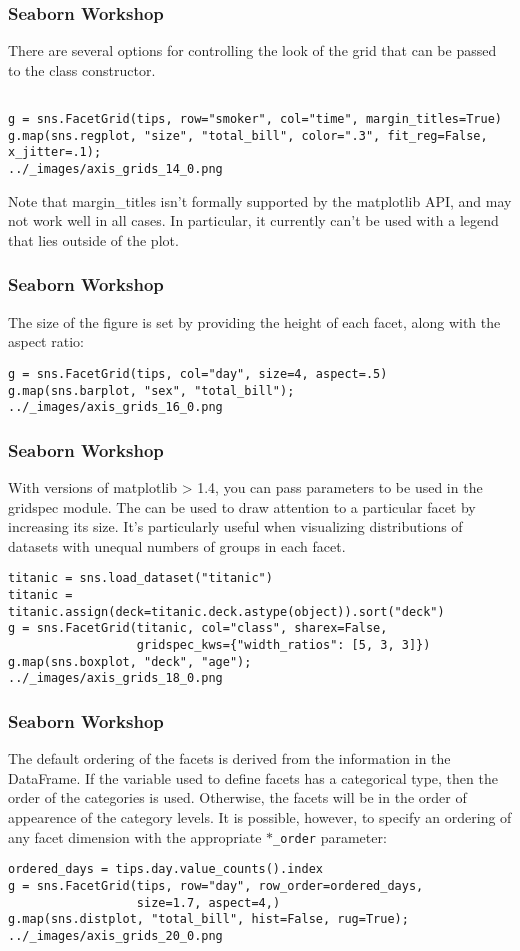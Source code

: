 \documentclass{beamer}
\begin{document}
\begin{frame}[fragile]
\frametitle{Seaborn Workshop}
\large

There are several options for controlling the look of the grid that can be passed to the class constructor.

\begin{verbatim}

g = sns.FacetGrid(tips, row="smoker", col="time", margin_titles=True)
g.map(sns.regplot, "size", "total_bill", color=".3", fit_reg=False, x_jitter=.1);
../_images/axis_grids_14_0.png
\end{verbatim}
Note that margin\_titles isn’t formally supported by the matplotlib API, and may not work well in all cases. In particular, it currently can’t be used with a legend that lies outside of the plot.
\end{frame}
\begin{frame}[fragile]
\frametitle{Seaborn Workshop}
\large
The size of the figure is set by providing the height of each facet, along with the aspect ratio:
\begin{verbatim}
g = sns.FacetGrid(tips, col="day", size=4, aspect=.5)
g.map(sns.barplot, "sex", "total_bill");
../_images/axis_grids_16_0.png
\end{verbatim}
\end{frame}
\begin{frame}[fragile]
\frametitle{Seaborn Workshop}
\large
With versions of matplotlib > 1.4, you can pass parameters to be used in the gridspec module. The can be used to draw attention to a particular facet by increasing its size. It’s particularly useful when visualizing distributions of datasets with unequal numbers of groups in each facet.
\begin{verbatim}
titanic = sns.load_dataset("titanic")
titanic = titanic.assign(deck=titanic.deck.astype(object)).sort("deck")
g = sns.FacetGrid(titanic, col="class", sharex=False,
                  gridspec_kws={"width_ratios": [5, 3, 3]})
g.map(sns.boxplot, "deck", "age");
../_images/axis_grids_18_0.png
\end{verbatim}
\end{frame}
\begin{frame}[fragile]
\frametitle{Seaborn Workshop}
\large
The default ordering of the facets is derived from the information in the DataFrame. If the variable used to define facets has a categorical type, then the order of the categories is used. Otherwise, the facets will be in the order of appearence of the category levels. It is possible, however, to specify an ordering of any facet dimension with the appropriate \texttt{$\ast$\_order} parameter:

\begin{verbatim}
ordered_days = tips.day.value_counts().index
g = sns.FacetGrid(tips, row="day", row_order=ordered_days,
                  size=1.7, aspect=4,)
g.map(sns.distplot, "total_bill", hist=False, rug=True);
../_images/axis_grids_20_0.png
\end{verbatim}
\end{frame}
\end{document}
